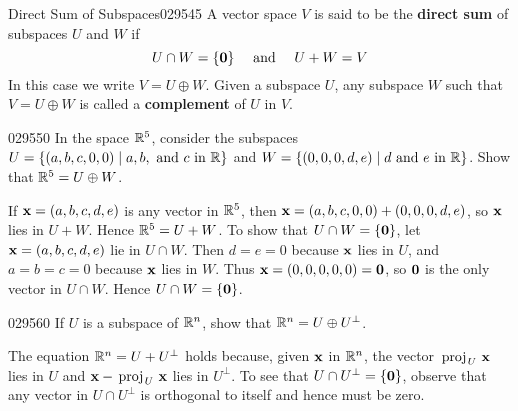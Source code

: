 \begin{definition}{Direct Sum of Subspaces}{029545}
A vector space $V$ is said to be the \textbf{direct sum} of subspaces $U$ and $W$ if
\begin{equation*}
U \cap W = \{ \textbf{0} \} \quad \mbox{ and } \quad U + W = V
\end{equation*}
In this case we write $V = U \oplus W$. Given a subspace $U$, any subspace $W$ such that $V = U \oplus W$ is called a \textbf{complement} of $U$ in $V$.
\end{definition}

\begin{example}{}{029550}
In the space $\mathbb{R}^5$, consider the subspaces $U = \{(a, b, c, 0, 0) \mid a, b, \mbox{ and } c \mbox{ in } \mathbb{R}\}$ and $W = \{(0, 0, 0, d, e) \mid d \mbox{ and } e \mbox{ in } \mathbb{R}\}$. Show that $\mathbb{R}^5 = U \oplus W$.


\begin{solution}
If $\textbf{x} = (a, b, c, d, e)$ is any vector in $\mathbb{R}^5$, then $\textbf{x} = (a, b, c, 0, 0) + (0, 0, 0, d, e)$, so $\textbf{x}$ lies in $U + W$. Hence $\mathbb{R}^5 = U + W$. To show that $U \cap W = \{\textbf{0}\}$, let $\textbf{x} = (a, b, c, d, e)$ lie in $U \cap W$. Then $d = e = 0$ because $\textbf{x}$ lies in $U$, and $a = b = c = 0$ because $\textbf{x}$ lies in $W$. Thus $\textbf{x} = (0, 0, 0, 0, 0) = \textbf{0}$, so $\textbf{0}$ is the only vector in $U \cap W$. Hence $U \cap W = \{\textbf{0}\}$.
\end{solution}
\end{example}

\begin{example}{}{029560}
If $U$ is a subspace of $\mathbb{R}^n$, show that $\mathbb{R}^n = U \oplus U^{\perp}$.


\begin{solution}
The equation $\mathbb{R}^n = U + U^{\perp}$ holds because, given $\textbf{x}$ in $\mathbb{R}^n$, the vector $\thinspace\operatorname{proj\medspace}_{\!U}\,{\textbf{x}}$ lies in $U$ and $\textbf{x} - \thinspace\operatorname{proj\medspace}_{\!U}\,{\textbf{x}}$ lies in $U^{\perp}$. To see that $U \cap U^{\perp} = \{\textbf{0}\}$, observe that any vector in $U \cap U^{\perp}$ is orthogonal to itself and hence must be zero.
\end{solution}
\end{example}

